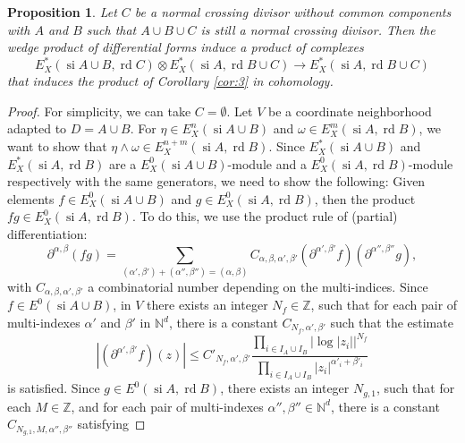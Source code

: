 \documentclass[11pt,a4paper]{amsart}
\newcommand{\Z}{\mathds{Z}}
\DeclareMathOperator{\si}{si}
\DeclareMathOperator{\rd}{rd}
\numberwithin{equation}{section}
\theoremstyle{plain}
\newtheorem{prop}{Proposition}[section]
\theoremstyle{definition}
\begin{document}
\begin{prop}\label{prop:9}
  Let $C$ be a normal crossing divisor without common components with
  $A$ and $B $ such that $A\cup B \cup C$ is still a normal crossing
  divisor.  
  Then the wedge product of differential forms induce a product of
  complexes 
  \begin{displaymath}
    E^{\ast}_{X}(\si A\cup B,\rd C)\otimes
    E^{\ast}_{X}(\si A,\rd B\cup C)\longrightarrow
    E^{\ast}_{X}(\si A,\rd B\cup C)
  \end{displaymath}
  that induces the product of Corollary \ref{cor:3} in cohomology. 
\end{prop}
\begin{proof}
For simplicity, we can take $C=\emptyset$. Let $V$ be a coordinate
neighborhood adapted to $D=A\cup B$. For $\eta\in E_{X}^n(\si A\cup B)$
and $\omega\in E_{X}^{m}(\si A, \rd B)$, we want to show that $\eta\wedge
\omega\in E_{X}^{n+m}(\si A, \rd B)$. Since $E_{X}^{\ast}(\si
A\cup B)$  and  $E_{X}^{\ast}(\si A,\rd B)$ are  a $E_{X}^0(\si A\cup
B)$-module and a $E_{X}^{0}(\si A, \rd B)$-module respectively with the
same generators, we need to show the
following: Given elements $f\in E_{X}^0(\si A\cup B)$ and $g\in E_{X}^0(\si A,
\rd B)$, then the product $fg\in E_{X}^{0}(\si A, \rd B)$. To do this, we use
the product rule of (partial) differentiation: 
\begin{displaymath}
\partial^{\alpha,\beta}(fg) = \sum_{(\alpha ',\beta  ')+(\alpha '',\beta
  '')=(\alpha ,\beta )}  C_{\alpha ,\beta ,\alpha ',\beta
  '}(\partial^{\alpha',\beta'}f)(\partial^{\alpha'',\beta''}g), 
\end{displaymath}
with $C_{\alpha ,\beta ,\alpha ',\beta'}$ a combinatorial number
depending on the multi-indices. 
Since $f\in E^0(\si A\cup B)$, in $V$ there exists an integer $N_{f}
\in  \Z$,
such that for each pair of multi-indexes $\alpha'$ and $\beta'$ in
$\mathbb{N}^{d}$, there is a constant $C_{N_{f},\alpha',\beta'}$ such
that the estimate
\begin{displaymath}
|(\partial ^{\alpha',\beta'}f)(z)|\le C'_{N_{f},\alpha' ,\beta'}
    \frac{\prod_{i\in I_A\cup I_{B}}|\log|z_i||^{N_{f}}}{\prod_{i\in
        I_{A}\cup I_{B}}|z_{i}|^{\alpha' _{i}+\beta' _{i}}} 
  \end{displaymath}
  is satisfied. 
Since $g\in E^{0}(\si A, \rd B)$, there exists an integer $N_{g,1}$,
such that for each $M\in \mathbb{Z}$, and for each pair of
multi-indexes $\alpha'',\beta''\in\mathbb{N}^{d}$, there is a constant
$C_{N_{g,1}, M, \alpha'',\beta''}$ satisfying 

\end{proof}
\end{document}

